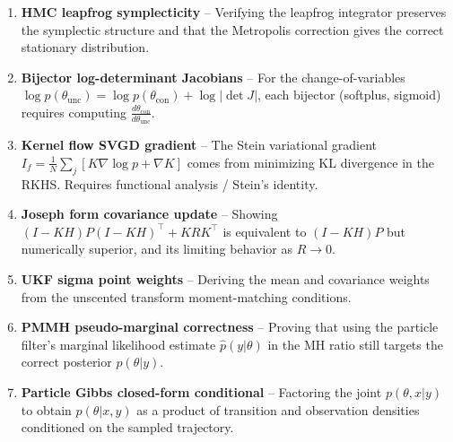 \documentclass[12pt]{article}
\begin{document}
\begin{enumerate}
\item \textbf{HMC leapfrog symplecticity} -- Verifying the leapfrog integrator preserves the symplectic structure and that the Metropolis correction gives the correct stationary distribution.

\item \textbf{Bijector log-determinant Jacobians} -- For the change-of-variables $\log p(\theta_{\text{unc}}) = \log p(\theta_{\text{con}}) + \log|\det J|$, each bijector (softplus, sigmoid) requires computing $\frac{d\theta_{\text{con}}}{d\theta_{\text{unc}}}$.

\item \textbf{Kernel flow SVGD gradient} -- The Stein variational gradient $I_f = \frac{1}{N}\sum_j [K \nabla\log p + \nabla K]$ comes from minimizing KL divergence in the RKHS. Requires functional analysis / Stein's identity.

\item \textbf{Joseph form covariance update} -- Showing $(I-KH)P(I-KH)^\top + KRK^\top$ is equivalent to $(I-KH)P$ but numerically superior, and its limiting behavior as $R \to 0$.

\item \textbf{UKF sigma point weights} -- Deriving the mean and covariance weights from the unscented transform moment-matching conditions.

\item \textbf{PMMH pseudo-marginal correctness} -- Proving that using the particle filter's marginal likelihood estimate $\hat{p}(y|\theta)$ in the MH ratio still targets the correct posterior $p(\theta|y)$.

\item \textbf{Particle Gibbs closed-form conditional} -- Factoring the joint $p(\theta, x | y)$ to obtain $p(\theta | x, y)$ as a product of transition and observation densities conditioned on the sampled trajectory.
\end{enumerate}
\end{document}
